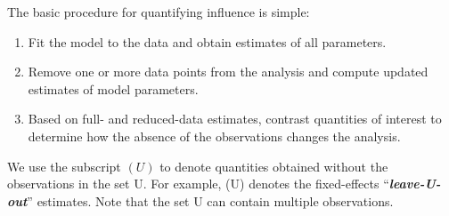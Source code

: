 \documentclass[12pt, a4paper]{report}
\theoremstyle{plain}
\theoremstyle{definition}
\theoremstyle{remark}
\begin{document}
The basic procedure for quantifying influence is simple:

\begin{enumerate}
	\item Fit the model to the data and obtain estimates of all parameters.
	\item Remove one or more data points from the analysis and compute updated estimates of model parameters.
	\item Based on full- and reduced-data estimates, contrast quantities of interest to determine how the absence
	of the observations changes the analysis.
\end{enumerate}
We use the subscript $(U)$ to denote quantities obtained without the observations in the set U. For example,
(U) denotes the fixed-effects “\textit{\textbf{leave-U-out}}” estimates. Note that the set U can contain multiple observations.




\end{document}
